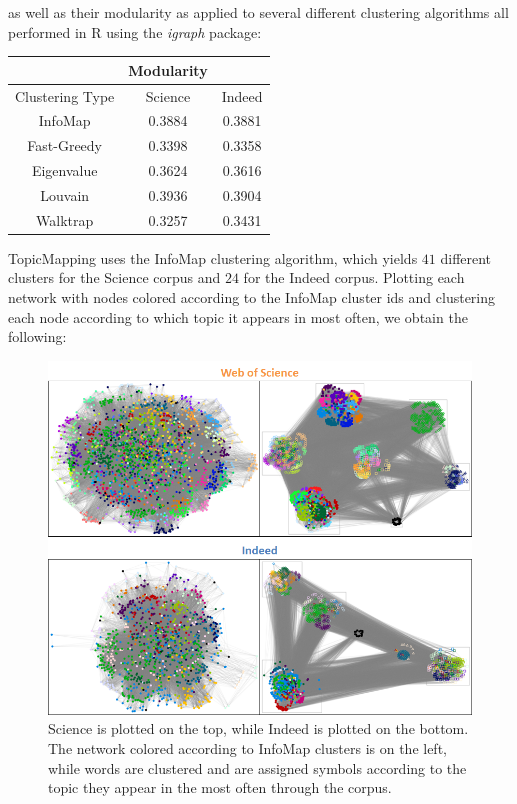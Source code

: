 \documentclass[12pt]{article}
\begin{document}
\noindent as well as their modularity as applied to several different clustering algorithms all performed in R using the \textit{igraph} package:
\vspace{2mm}
\begin{center}
	\begin{tabular}{ |c|c|c|  }
		\hline
		&Modularity& \\
		\hline
		Clustering Type&Science&Indeed \\ 
		\hline 
		InfoMap& 0.3884&0.3881 \\
		Fast-Greedy& 0.3398& 0.3358\\
		Eigenvalue& 0.3624&0.3616 \\
		Louvain&0.3936&0.3904 \\
		Walktrap&0.3257&0.3431 \\
		\hline
	\end{tabular}
\end{center}
\vspace{2mm}
\noindent TopicMapping uses the InfoMap clustering algorithm, which yields $41$ different clusters for the Science corpus and $24$ for the Indeed corpus. Plotting each network with nodes colored according to the InfoMap cluster ids and clustering each node according to which topic it appears in most often, we obtain the following:
\vspace{2mm}
\begin{figure}[H]
	\centering
	\includegraphics[scale=0.5]{Images/networks.png}
	\caption{Science is plotted on the top, while Indeed is plotted on the bottom. The network colored according to InfoMap clusters is on the left, while words are clustered and are assigned symbols according to the topic they appear in the most often through the corpus.}
\end{figure}
\end{document}
